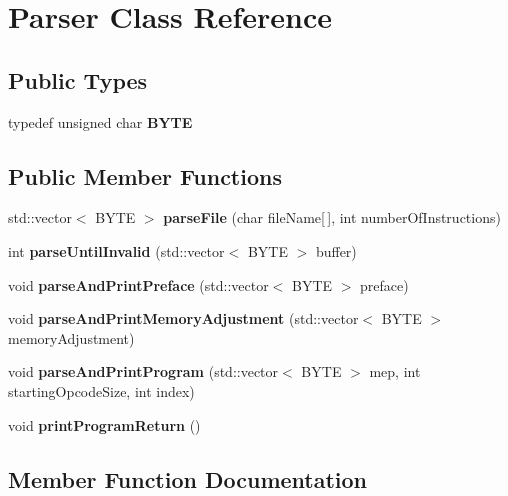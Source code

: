 \section{\-Parser \-Class \-Reference}
\label{class_parser}
\subsection*{\-Public \-Types}
\begin{DoxyCompactItemize}
\item 
typedef unsigned char {\bfseries \-B\-Y\-T\-E}\label{class_parser_a57c1588f2c5175fbc7739f674762249b}

\end{DoxyCompactItemize}
\subsection*{\-Public \-Member \-Functions}
\begin{DoxyCompactItemize}
\item 
std\-::vector$<$ \-B\-Y\-T\-E $>$ {\bf parse\-File} (char file\-Name[$\,$], int number\-Of\-Instructions)
\item 
int {\bf parse\-Until\-Invalid} (std\-::vector$<$ \-B\-Y\-T\-E $>$ buffer)
\item 
void {\bf parse\-And\-Print\-Preface} (std\-::vector$<$ \-B\-Y\-T\-E $>$ preface)
\item 
void {\bf parse\-And\-Print\-Memory\-Adjustment} (std\-::vector$<$ \-B\-Y\-T\-E $>$ memory\-Adjustment)
\item 
void {\bf parse\-And\-Print\-Program} (std\-::vector$<$ \-B\-Y\-T\-E $>$ mep, int starting\-Opcode\-Size, int index)
\item 
void {\bf print\-Program\-Return} ()
\end{DoxyCompactItemize}


\subsection{\-Member \-Function \-Documentation}
